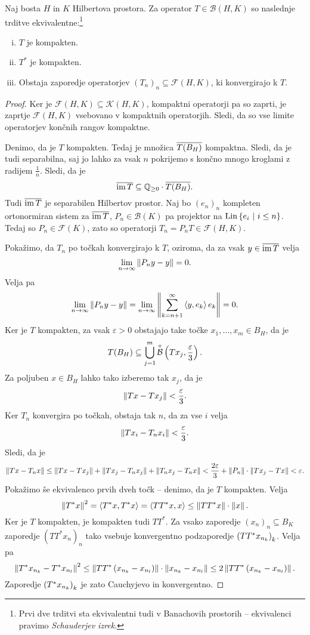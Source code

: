 
\begin{izrek}
Naj bosta $H$ in $K$ Hilbertova prostora. Za operator
$T \in \mathcal{B}(H,K)$ so naslednje trditve
ekvivalentne:\footnote{Prvi dve trditvi sta ekvivalentni tudi v
Banachovih prostorih -- ekvivalenci pravimo \emph{Schauderjev
izrek}.}

\begin{enumerate}[i)]
\item $T$ je kompakten.
\item $T^*$ je kompakten.
\item Obstaja zaporedje operatorjev
$(T_n)_n \subseteq \mathcal{F}(H,K)$, ki konvergirajo k $T$.
\end{enumerate}
\end{izrek}

\begin{proof}
Ker je $\mathcal{F}(H,K) \subseteq \mathcal{K}(H,K)$, kompaktni
operatorji pa so zaprti, je zaprtje $\mathcal{F}(H,K)$ vsebovano v
kompaktnih operatorjih. Sledi, da so vse limite operatorjev končnih
rangov kompaktne.

Denimo, da je $T$ kompakten. Tedaj je množica $\overline{T(B_H)}$
kompaktna. Sledi, da je tudi separabilna, saj jo lahko za vsak $n$
pokrijemo s končno mnogo kroglami z radijem $\frac{1}{n}$. Sledi,
da je
\[
\overline{\operatorname{im} T} \subseteq \mathbb{Q}_{\geq 0} \cdot \overline{T(B_H)}.
\]
Tudi $\overline{\operatorname{im} T}$ je separabilen Hilbertov prostor. Naj bo
$(e_n)_n$ kompleten ortonormiran sistem za $\overline{\operatorname{im} T}$,
$P_n \in \mathcal{B}(K)$ pa projektor na
$\operatorname{Lin} \left\{e_i~\middle\vert~i \leq n\right\}$. Tedaj so $P_n \in \mathcal{F}(K)$,
zato so operatorji $T_n = P_n T \in \mathcal{F}(H,K)$.

Pokažimo, da $T_n$ po točkah konvergirajo k $T$, oziroma, da za
vsak $y \in \overline{\operatorname{im} T}$ velja
\[
\lim_{n \to \infty} \left\lVert P_n y - y\right\rVert = 0.
\]
Velja pa
\[
\lim_{n \to \infty} \left\lVert P_n y - y\right\rVert =
\lim_{n \to \infty} \left\lVert \sum_{k=n+1}^\infty \left\langle y,e_k\right\rangle e_k\right\rVert = 0.
\]
Ker je $T$ kompakten, za vsak $\varepsilon > 0$ obstajajo take
točke $x_1, \dots, x_m \in B_H$, da je
\[
T(B_H) \subseteq
\bigcup_{j=1}^m \overset{\circ}{\mathcal{B}} \left(Tx_j, \frac{\varepsilon}{3}\right).
\]
Za poljuben $x \in B_H$ lahko tako izberemo tak $x_j$, da je
\[
\left\lVert Tx - Tx_j\right\rVert < \frac{\varepsilon}{3}.
\]
Ker $T_n$ konvergira po točkah, obstaja tak $n$, da za vse $i$
velja
\[
\left\lVert Tx_i - T_nx_i\right\rVert < \frac{\varepsilon}{3}.
\]
Sledi, da je
\[
\left\lVert Tx - T_nx\right\rVert \leq
\left\lVert Tx - Tx_j\right\rVert + \left\lVert Tx_j - T_nx_j\right\rVert + \left\lVert T_nx_j - T_nx\right\rVert <
\frac{2 \varepsilon}{3} + \left\lVert P_n\right\rVert \cdot \left\lVert Tx_j - Tx\right\rVert <
\varepsilon.
\]
Pokažimo še ekvivalenco prvih dveh točk -- denimo, da je $T$
kompakten. Velja
\[\left\lVert T^*x\right\rVert^2 = \left\langle T^*x,T^*x\right\rangle =
\left\langle TT^*x,x\right\rangle \leq \left\lVert TT^*x\right\rVert \cdot \left\lVert x\right\rVert.
\]
Ker je $T$ kompakten, je kompakten tudi $TT^*$. Za vsako zaporedje
$(x_n)_n \subseteq B_K$ zaporedje $(TT^*x_n)_n$ tako vsebuje
konvergentno podzaporedje $\left(TT^*x_{n_k}\right)_k$. Velja pa
\[
\left\lVert T^*x_{n_k} - T^*x_{n_l}\right\rVert^2 \leq
\left\lVert TT^* \left(x_{n_k}-x_{n_l}\right)\right\rVert \cdot \left\lVert x_{n_k}-x_{n_l}\right\rVert \leq
2 \left\lVert TT^* \left(x_{n_k}-x_{n_l}\right)\right\rVert.
\]
Zaporedje $\left(T^*x_{n_k}\right)_k$ je zato Cauchyjevo in konvergentno.
\end{proof}

